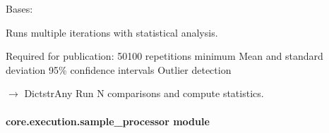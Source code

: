 \documentclass[letterpaper,10pt,english]{sphinxmanual}
\begin{document}
\begin{fulllineitems}
\label{\detokenize{core.execution.repetition:core.execution.repetition.RepetitionExperiment}}
\pysigstartsignatures
\pysiglinewithargsret
{}
{\sphinxparamcomma {}}
{}
\pysigstopsignatures
\sphinxAtStartPar
Bases: 

\sphinxAtStartPar
Runs multiple iterations with statistical analysis.

\sphinxAtStartPar
Required for publication:
\sphinxhyphen{} 50\sphinxhyphen{}100 repetitions minimum
\sphinxhyphen{} Mean and standard deviation
\sphinxhyphen{} 95\% confidence intervals
\sphinxhyphen{} Outlier detection

\begin{fulllineitems}
\label{\detokenize{core.execution.repetition:core.execution.repetition.RepetitionExperiment.run_comparison}}
\pysigstartsignatures
\pysiglinewithargsret
{}
{\sphinxparamcomma {}\sphinxparamcomma {}}
{{ $\rightarrow$ Dict\DUrole{p}{{[}}strAny\DUrole{p}{{]}}}}
\pysigstopsignatures
\sphinxAtStartPar
Run N comparisons and compute statistics.

\end{fulllineitems}


\end{fulllineitems}


\sphinxstepscope


\paragraph{core.execution.sample\_processor module}
\label{\detokenize{core.execution.sample_processor:module-core.execution.sample_processor}}\label{\detokenize{core.execution.sample_processor:core-execution-sample-processor-module}}\label{\detokenize{core.execution.sample_processor::doc}}
\end{document}
